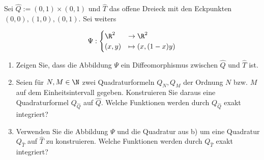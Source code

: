 
\begin{exercise}

  Sei $\hat Q := (0, 1) \times (0, 1)$ und $\hat T$ das offene Dreieck mit den Eckpunkten $(0, 0), (1, 0), (0, 1)$.
  Sei weiters
  
  \begin{align*}
    \Psi:
    \begin{cases}
      \R^2   & \to \R^2 \\
      (x, y) & \mapsto (x, (1 - x)y)
    \end{cases}
  \end{align*}
  
  \begin{enumerate}[label = \textbf{\alph*)}]
  
    \item Zeigen Sie, dass die Abbildung $\Psi$ ein Diffeomorphismus zwischen $\hat Q$ und $\hat T$ ist.
  
    \item Seien für $N, M \in \N$ zwei Quadraturformeln $Q_N, Q_M$ der Ordnung $N$ bzw. $M$ auf dem Einheitsintervall gegeben.
    Konstruieren Sie daraus eine Quadraturformel $Q_{\hat Q}$ auf $\hat Q$.
    Welche Funktionen werden durch $Q_{\hat Q}$ exakt integriert?
  
    \item Verwenden Sie die Abbildung $\Psi$ und die Quadratur aus b) um eine Quadratur $Q_{\hat T}$ auf $\hat T$ zu konstruieren.
    Welche Funktionen werden durch $Q_{\hat T}$ exakt integriert?
  
  \end{enumerate}
  
  \end{exercise}
  
  
